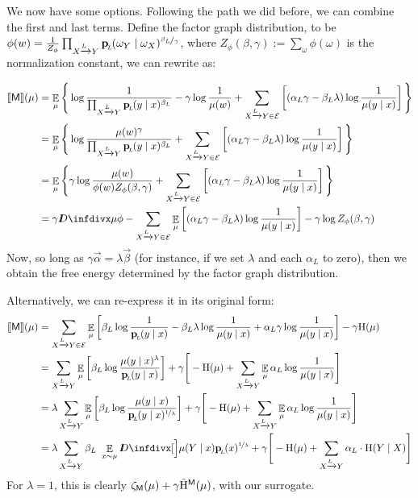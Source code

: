 \documentclass{article}
\newcommand{\bp}[1][L]{\mat{p}_{\!_#1\!}}
\newcommand{\Ed}{\mathcal E}
\newcommand{\sfM}{\mathsf M}
\newcommand{\alle}[1][L]{_{ X \xrightarrow{\!\!#1} Y }}
\begin{document}
	We now have some options. Following the path we did before, we can combine the first and last terms.  Define the factor graph distribution, to be $\phi(w) = \frac{1}{Z_{\phi}}\prod\alle \bp(\omega_Y \mid \omega_X)^{\nicefrac{\beta_L}{\gamma}}$, where $Z_\phi(\beta, \gamma) := \sum_{\omega} \phi(\omega)$ is the normalization constant, we can rewrite as:
	
	\begin{align*}
		\bbr{\sfM}(\mu) &= \E_\mu \Bigg\{ \log \frac{1}{\prod\alle \bp(y\mid x)^{\beta_L}}
			- \gamma \log \frac{1}{\mu(w)} 
		 + \sum_{ X \xrightarrow{\!\!L} Y  \in \Ed } \left[
		(\alpha_L \gamma - \beta_L \lambda) \log \frac{1}{\mu(y \mid x)} \right] \Bigg\} \\
			&= \E_\mu \Bigg\{ \log \frac{\mu(w)^\gamma}{\prod\alle \bp(y\mid x)^{\beta_L}} 
		+ \sum_{ X \xrightarrow{\!\!L} Y  \in \Ed } \left[
		(\alpha_L \gamma - \beta_L \lambda) \log \frac{1}{\mu(y \mid x)} \right] \Bigg\} \\
			&= \E_\mu \Bigg\{ \gamma \log \frac{\mu(w)}{\phi(w) Z_\phi(\beta,\gamma)} 
		+ \sum_{ X \xrightarrow{\!\!L} Y  \in \Ed } \left[
		(\alpha_L \gamma - \beta_L \lambda) \log \frac{1}{\mu(y \mid x)} \right] \Bigg\} \\
		&=   \gamma \kldiv{\mu}{\phi} - \sum_{ X \xrightarrow{\!\!L} Y  \in \Ed }\E_\mu \left[
		(\alpha_L \gamma - \beta_L \lambda) \log \frac{1}{\mu(y \mid x)} \right] - \gamma \log Z_\phi(\beta,\gamma) \\
	\end{align*}
	Now, so long as $\gamma\vec\alpha = \lambda \vec\beta$ (for instance, if we set $\lambda$ and each $\alpha_L$ to zero), then we obtain the free energy determined by the factor graph distribution.
	
	Alternatively, we can re-express it in its original form:
	\begin{align*}
		\bbr{\sfM}(\mu) &=\sum_{ X \xrightarrow{\!\!L} Y  \in \Ed } \E_\mu  \left[
		\beta_L \log \frac{1}{\bp(y\mid x)} - \beta_L \lambda \log \frac{1}{\mu(y \mid x)} + \alpha_L \gamma \log \frac{1}{\mu(y\mid x)}  \right] - \gamma \H(\mu) \\
		&= \sum_{ X \xrightarrow{\!\!L} Y } \E_\mu  \left[
		\beta_L \log \frac{\mu(y \mid x)^\lambda}{\bp(y\mid x)} \right] + \gamma \Bigg[  - \H(\mu) + \sum_{ X \xrightarrow{\!\!L} Y } \E_\mu \alpha_L  \log \frac{1}{\mu(y\mid x)} \Bigg] \\
		&= \lambda \sum_{ X \xrightarrow{\!\!L} Y } \E_\mu  \left[
		\beta_L \log \frac{\mu(y \mid x)}{\bp(y\mid x)^{\nicefrac{1}{\lambda}}} \right] + \gamma \Bigg[  - \H(\mu) + \sum_{ X \xrightarrow{\!\!L} Y } \E_\mu \alpha_L  \log \frac{1}{\mu(y\mid x)} \Bigg] \\
		&= \lambda \sum_{ X \xrightarrow{\!\!L} Y }\beta_L\ \E_{x \sim \mu}  \kldiv[\Big]{\mu(Y\mid x)}{\bp(x)^{\nicefrac{1}{\lambda}}} + \gamma \Bigg[  - \H(\mu) + \sum_{ X \xrightarrow{\!\!L} Y } \alpha_L \cdot\H(Y \mid X)\Bigg] \\
	\end{align*}
	For $\lambda = 1$, this is clearly $\zeta_\sfM(\mu) + \gamma \tilde \H^\sfM(\mu)$, with our surrogate. 
	
\end{document}
